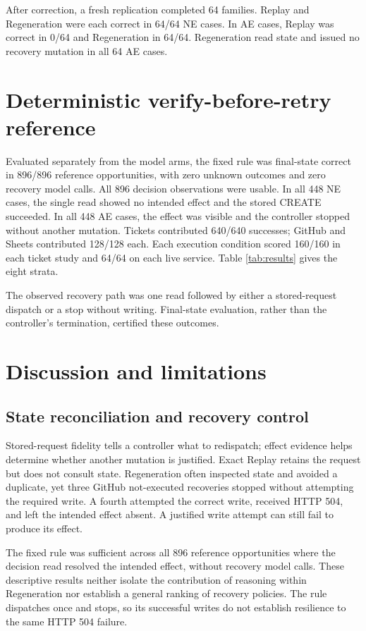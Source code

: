 \documentclass[conference]{IEEEtran}
\begin{document}
After correction, a fresh replication completed 64 families. Replay and Regeneration were each correct in 64/64 NE cases. In AE cases, Replay was correct in 0/64 and Regeneration in 64/64. Regeneration read state and issued no recovery mutation in all 64 AE cases.


\section{Deterministic verify-before-retry reference}

Evaluated separately from the model arms, the fixed rule was final-state correct in 896/896 reference opportunities, with zero unknown outcomes and zero recovery model calls. All 896 decision observations were usable. In all 448 NE cases, the single read showed no intended effect and the stored CREATE succeeded. In all 448 AE cases, the effect was visible and the controller stopped without another mutation. Tickets contributed 640/640 successes; GitHub and Sheets contributed 128/128 each. Each execution condition scored 160/160 in each ticket study and 64/64 on each live service. Table \ref{tab:results} gives the eight strata.


The observed recovery path was one read followed by either a stored-request dispatch or a stop without writing. Final-state evaluation, rather than the controller's termination, certified these outcomes.


\section{Discussion and limitations}

\subsection{State reconciliation and recovery control}

Stored-request fidelity tells a controller what to redispatch; effect evidence helps determine whether another mutation is justified. Exact Replay retains the request but does not consult state. Regeneration often inspected state and avoided a duplicate, yet three GitHub not-executed recoveries stopped without attempting the required write. A fourth attempted the correct write, received HTTP 504, and left the intended effect absent. A justified write attempt can still fail to produce its effect.


The fixed rule was sufficient across all 896 reference opportunities where the decision read resolved the intended effect, without recovery model calls. These descriptive results neither isolate the contribution of reasoning within Regeneration nor establish a general ranking of recovery policies. The rule dispatches once and stops, so its successful writes do not establish resilience to the same HTTP 504 failure.
\end{document}
